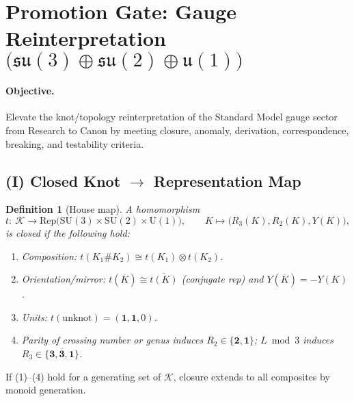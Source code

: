 \documentclass[11pt]{article}
\newtheorem{definition}{Definition}[section]
\begin{document}
\section{Promotion Gate: Gauge Reinterpretation $\big(\mathfrak{su}(3)\oplus\mathfrak{su}(2)\oplus\mathfrak u(1)\big)$}
\label{sec:gauge_promotion_gate}

\paragraph{Objective.}
Elevate the knot/topology reinterpretation of the Standard Model gauge sector from Research to Canon by meeting closure, anomaly, derivation, correspondence, breaking, and testability criteria.

\subsection*{(I) Closed Knot $\to$ Representation Map}
\begin{definition}[House map]
	A homomorphism
	\[
		t:\ \mathcal{K}\to \mathrm{Rep}\!\big(\mathrm{SU}(3)\times\mathrm{SU}(2)\times\mathrm{U}(1)\big),
		\qquad
		K\mapsto \big(R_3(K),R_2(K),Y(K)\big),
	\]
	is \emph{closed} if the following hold:
	\begin{enumerate}
		\item Composition: $t(K_1\#K_2)\cong t(K_1)\otimes t(K_2)$.
		\item Orientation/mirror: $t(\overline{K})\cong \overline{t(K)}$ (conjugate rep) and $Y(\overline{K})=-Y(K)$.
		\item Units: $t(\text{unknot})=(\mathbf{1},\mathbf{1},0)$.
		\item Parity of crossing number or genus induces $R_2\in\{\mathbf{2},\mathbf{1}\}$; $L\bmod 3$ induces $R_3\in\{\mathbf 3,\overline{\mathbf 3},\mathbf 1\}$.
	\end{enumerate}
\end{definition}

\begin{proposition}
	If (1)–(4) hold for a generating set of $\mathcal{K}$, closure extends to all composites by monoid generation.
\end{proposition}
\end{document}
